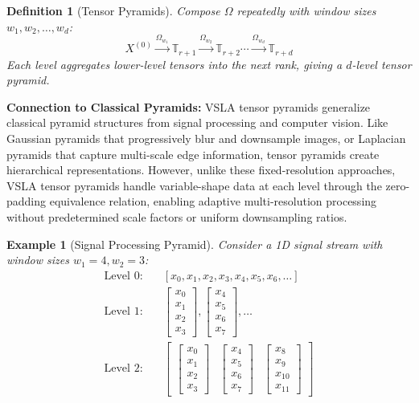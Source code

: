 \documentclass[11pt]{article}
\newtheorem{definition}[theorem]{Definition}
\newtheorem{example}[theorem]{Example}
\begin{document}
\begin{definition}[Tensor Pyramids]
Compose $\Omega$ repeatedly with window sizes $w_1, w_2, \ldots, w_d$:
\[
X^{(0)} \xrightarrow{\Omega_{w_1}} \mathbb{T}_{r+1} \xrightarrow{\Omega_{w_2}} \mathbb{T}_{r+2} \cdots \xrightarrow{\Omega_{w_d}} \mathbb{T}_{r+d}
\]
Each level aggregates lower-level tensors into the next rank, giving a \emph{$d$-level tensor pyramid}.
\end{definition}

\textbf{Connection to Classical Pyramids:} VSLA tensor pyramids generalize classical pyramid structures from signal processing and computer vision. Like Gaussian pyramids that progressively blur and downsample images, or Laplacian pyramids that capture multi-scale edge information, tensor pyramids create hierarchical representations. However, unlike these fixed-resolution approaches, VSLA tensor pyramids handle variable-shape data at each level through the zero-padding equivalence relation, enabling adaptive multi-resolution processing without predetermined scale factors or uniform downsampling ratios.

\begin{example}[Signal Processing Pyramid]
Consider a 1D signal stream with window sizes $w_1 = 4, w_2 = 3$:
\begin{align}
\text{Level 0:} &\quad [x_0, x_1, x_2, x_3, x_4, x_5, x_6, \ldots] \\
\text{Level 1:} &\quad \begin{bmatrix} x_0 \\ x_1 \\ x_2 \\ x_3 \end{bmatrix}, \begin{bmatrix} x_4 \\ x_5 \\ x_6 \\ x_7 \end{bmatrix}, \ldots \\
\text{Level 2:} &\quad \begin{bmatrix} \begin{bmatrix} x_0 \\ x_1 \\ x_2 \\ x_3 \end{bmatrix} & \begin{bmatrix} x_4 \\ x_5 \\ x_6 \\ x_7 \end{bmatrix} & \begin{bmatrix} x_8 \\ x_9 \\ x_{10} \\ x_{11} \end{bmatrix} \end{bmatrix}
\end{align}
\end{example}
\end{document}
